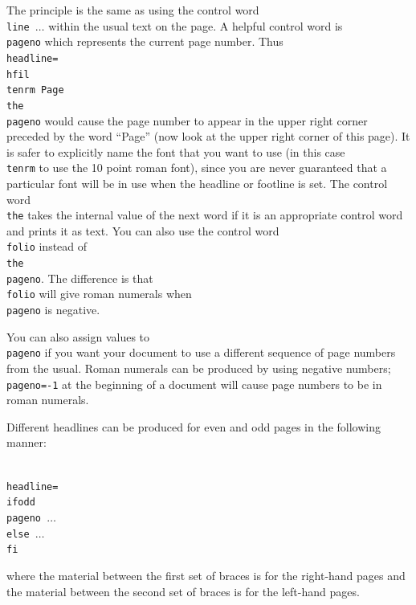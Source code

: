 The principle is the same as using the control word {\tt \\line\lb 
$\dots$\rb} within the usual text on the page.  A helpful 
control word is {\tt \\pageno} which represents the current page 
number. Thus {\tt \\headline=\lb\\hfil \\tenrm Page \\the\\pageno\rb} 
would cause the page number to appear in the upper 
right corner preceded by the word ``Page'' (now look at the upper 
right corner of this page). It is safer to explicitly name the 
font that you want to use (in this case {\tt \\tenrm} to use the 
10 point roman font), since you are never guaranteed that a 
particular font will be in use when the headline or footline is 
set. The control word {\tt \\the} takes the internal value of the 
next word if it is an appropriate control word and prints it as 
text. You can also use the control word {\tt \\folio} instead of 
{\tt \\the \\pageno}. The difference is that {\tt \\folio} will 
give roman numerals when {\tt \\pageno} is negative. 

You can also assign values to {\tt \\pageno} if you want your 
document to use a different sequence of page numbers from the 
usual.  Roman numerals can be produced by using negative numbers; 
{\tt \\pageno=-1} at the beginning of a document will cause page 
numbers to be in roman numerals. 

Different headlines can be produced for even and odd pages in 
the following manner: 

{\tt 
\\headline=\lb\\ifodd \\pageno \lb$\dots$\rb \\else \lb$\dots$\rb 
\\fi\rb} 

\noindent 
where the material between the first set of braces is for the 
right-hand pages and the material between the second set of 
braces is for the left-hand pages. 


